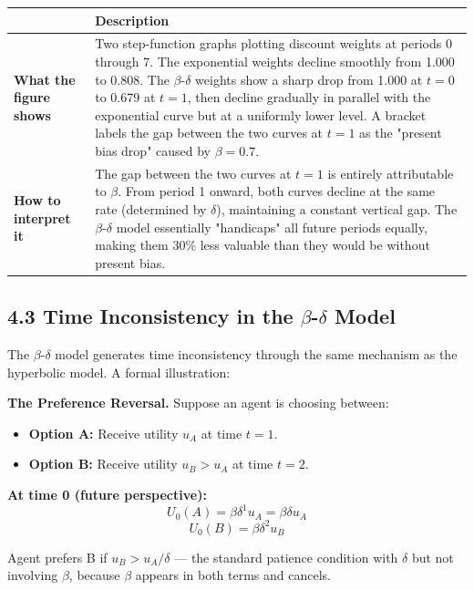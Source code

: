 \documentclass[12pt, letterpaper]{article}
\begin{document}
\begin{table}[H]
\centering
\small
\begin{tabularx}{\linewidth}{lY}
\toprule
 & Description \\
\midrule
\textbf{What the figure shows} & Two step-function graphs plotting discount weights at periods 0 through 7. The exponential weights decline smoothly from 1.000 to 0.808. The $\beta$-$\delta$ weights show a sharp drop from 1.000 at $t=0$ to 0.679 at $t=1$, then decline gradually in parallel with the exponential curve but at a uniformly lower level. A bracket labels the gap between the two curves at $t=1$ as the "present bias drop" caused by $\beta = 0.7$. \\
\textbf{How to interpret it} & The gap between the two curves at $t=1$ is entirely attributable to $\beta$. From period 1 onward, both curves decline at the same rate (determined by $\delta$), maintaining a constant vertical gap. The $\beta$-$\delta$ model essentially "handicaps" all future periods equally, making them 30\% less valuable than they would be without present bias. \\
\bottomrule
\end{tabularx}
\end{table}



\subsection{4.3 Time Inconsistency in the $\beta$-$\delta$ Model}


The $\beta$-$\delta$ model generates time inconsistency through the same mechanism as the hyperbolic model. A formal illustration:

\textbf{The Preference Reversal.} Suppose an agent is choosing between:
\begin{itemize}
\item \textbf{Option A:} Receive utility $u_A$ at time $t = 1$.
\item \textbf{Option B:} Receive utility $u_B > u_A$ at time $t = 2$.
\end{itemize}

\textbf{At time 0 (future perspective):} $$U_0(A) = \beta \delta^1 u_A = \beta \delta u_A$$ $$U_0(B) = \beta \delta^2 u_B$$

Agent prefers B if $u_B > u_A / \delta$ --- the standard patience condition with $\delta$ but not involving $\beta$, because $\beta$ appears in both terms and cancels.
\end{document}
